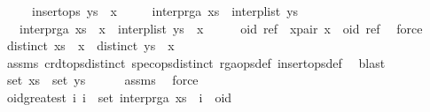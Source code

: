 \begin{isabellebody}
\ \ \ \ \ {\isachardoublequoteopen}insert{\isacharunderscore}ops\ {\isacharparenleft}ys\ {\isacharat}\ {\isacharbrackleft}x{\isacharbrackright}{\isacharparenright}{\isachardoublequoteclose}\isanewline
\ \ \ \ \ {\isachardoublequoteopen}interp{\isacharunderscore}rga\ xs\ {\isacharequal}\ interp{\isacharunderscore}list\ ys{\isachardoublequoteclose}\isanewline
\ \ \ {\isachardoublequoteopen}interp{\isacharunderscore}rga\ {\isacharparenleft}xs\ {\isacharat}\ {\isacharbrackleft}x{\isacharbrackright}{\isacharparenright}\ {\isacharequal}\ interp{\isacharunderscore}list\ {\isacharparenleft}ys\ {\isacharat}\ {\isacharbrackleft}x{\isacharbrackright}{\isacharparenright}{\isachardoublequoteclose}\isanewline
%
\isadelimproof
%
\endisadelimproof
%
\isatagproof
{}\isamarkupfalse%
\ {\isacharminus}\isanewline
\ \ \isamarkupfalse%
\ oid\ ref\ \ x{\isacharunderscore}pair{\isacharcolon}\ {\isachardoublequoteopen}x\ {\isacharequal}\ {\isacharparenleft}oid{\isacharcomma}\ ref{\isacharparenright}{\isachardoublequoteclose}\ \isamarkupfalse%
\ force\isanewline
\ \ \isamarkupfalse%
\ {\isachardoublequoteopen}distinct\ {\isacharparenleft}xs\ {\isacharat}\ {\isacharbrackleft}x{\isacharbrackright}{\isacharparenright}{\isachardoublequoteclose}\ \ {\isachardoublequoteopen}distinct\ {\isacharparenleft}ys\ {\isacharat}\ {\isacharbrackleft}x{\isacharbrackright}{\isacharparenright}{\isachardoublequoteclose}\isanewline
\ \ \ \ \isamarkupfalse%
\ assms\ crdt{\isacharunderscore}ops{\isacharunderscore}distinct\ spec{\isacharunderscore}ops{\isacharunderscore}distinct\ rga{\isacharunderscore}ops{\isacharunderscore}def\ insert{\isacharunderscore}ops{\isacharunderscore}def\ \isamarkupfalse%
\ blast{\isacharplus}\isanewline
\ \ \isamarkupfalse%
\ \isamarkupfalse%
\ {\isachardoublequoteopen}set\ xs\ {\isacharequal}\ set\ ys{\isachardoublequoteclose}\isanewline
\ \ \ \ \isamarkupfalse%
\ assms{\isacharparenleft}{}{\isacharparenright}\ \isamarkupfalse%
\ force\isanewline
\ \ \isamarkupfalse%
\ oid{\isacharunderscore}greatest{\isacharcolon}\ {\isachardoublequoteopen}{\isasymAnd}i{\isachardot}\ i\ {\isasymin}\ set\ {\isacharparenleft}interp{\isacharunderscore}rga\ xs{\isacharparenright}\ {\isasymLongrightarrow}\ i\ {\isacharless}\ oid{\isachardoublequoteclose}\isanewline
\ \ \isamarkupfalse%
\ {\isacharminus}\isanewline

\end{isabellebody}
